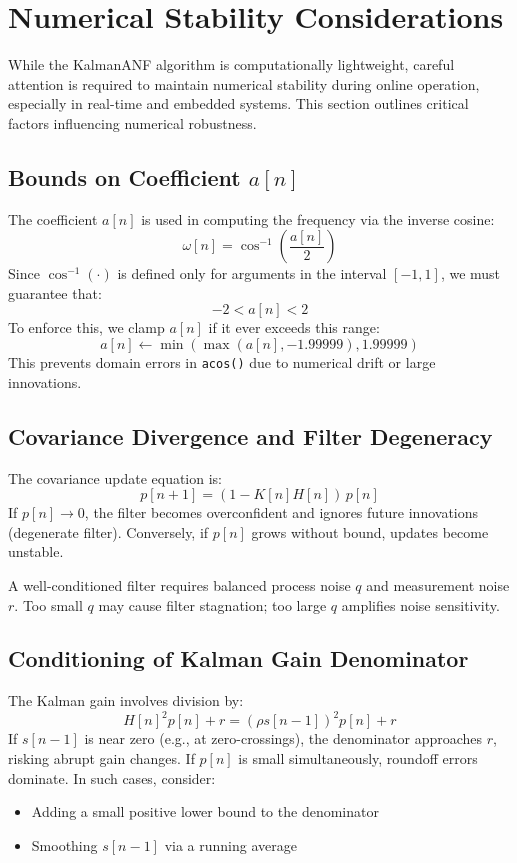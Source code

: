 \documentclass{article}
\begin{document}
\section{Numerical Stability Considerations}

While the KalmanANF algorithm is computationally lightweight, careful attention is required to maintain numerical stability during online operation, especially in real-time and embedded systems. This section outlines critical factors influencing numerical robustness.

\subsection{Bounds on Coefficient \texorpdfstring{$a[n]$}{a[n]}}

The coefficient \( a[n] \) is used in computing the frequency via the inverse cosine:
\[
\omega[n] = \cos^{-1}\left(\frac{a[n]}{2}\right)
\]
Since \( \cos^{-1}(\cdot) \) is defined only for arguments in the interval \([-1, 1]\), we must guarantee that:
\[
-2 < a[n] < 2
\]
To enforce this, we clamp \( a[n] \) if it ever exceeds this range:
\[
a[n] \gets \min\left(\max\left(a[n], -1.99999\right), 1.99999\right)
\]
This prevents domain errors in \texttt{acos()} due to numerical drift or large innovations.

\subsection{Covariance Divergence and Filter Degeneracy}

The covariance update equation is:
\[
p[n+1] = (1 - K[n] H[n])\,p[n]
\]
If \( p[n] \to 0 \), the filter becomes overconfident and ignores future innovations (degenerate filter). Conversely, if \( p[n] \) grows without bound, updates become unstable.

A well-conditioned filter requires balanced process noise \( q \) and measurement noise \( r \). Too small \( q \) may cause filter stagnation; too large \( q \) amplifies noise sensitivity.

\subsection{Conditioning of Kalman Gain Denominator}

The Kalman gain involves division by:
\[
H[n]^2 p[n] + r = (\rho s[n-1])^2 p[n] + r
\]
If \( s[n-1] \) is near zero (e.g., at zero-crossings), the denominator approaches \( r \), risking abrupt gain changes. If \( p[n] \) is small simultaneously, roundoff errors dominate. In such cases, consider:
\begin{itemize}
  \item Adding a small positive lower bound to the denominator
  \item Smoothing \( s[n-1] \) via a running average
\end{itemize}
\end{document}
